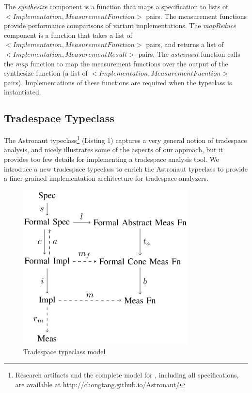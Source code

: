 \documentclass{sig-alternate}
\begin{document}
The {\em synthesize} component is a function that maps a specification to lists of $<Implementation, MeasurementFunction>$ pairs. The measurement functions provide performance comparisons of variant implementations. The {\em mapReduce} component is a function that takes a list of $<Implementation, MeasurementFunction>$ pairs, and returns a list of $<Implementation, MeasurementResult>$ pairs. The {\em astronaut} function calls the {\em map} function to map the measurement functions over the output of the synthesize function (a list of $<Implementation, MeasurementFucntion>$ pairs). Implementations of these functions are required when the typeclass is instantiated.

\subsection{Tradespace Typeclass}
The Astronaut typeclass\footnote{Research artifacts and the complete model for \@approach, including all specifications, are available at http://chongtang.github.io/Astronaut/} (Listing 1) captures a very general notion of tradespace analysis, and nicely illustrates some of the aspects of our approach, but it provides too few details for implementing a tradespace analysis tool. We introduce a new tradespace typeclass to enrich the Astronaut typeclass to provide a finer-grained implementation architecture for tradespace analyzers.

\begin{figure}[t!]
\vspace{0.5cm}
\centering
\includegraphics[width=0.8\textwidth]{img/tradespace_model.png}
\caption{Tradespace typeclass model}
\label{fig:tradespace_model}
\end{figure}
\end{document}
